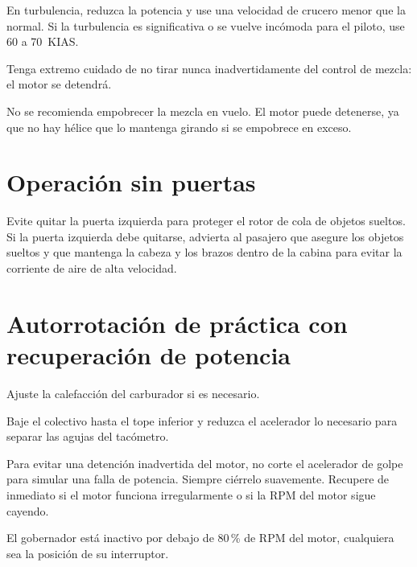 \begin{precaucion}
En turbulencia, reduzca la potencia y use una velocidad de crucero menor que la normal. Si la turbulencia es significativa o se vuelve incómoda para el piloto, use 60 a 70~KIAS.
\end{precaucion}

\begin{precaucion}
Tenga extremo cuidado de no tirar nunca inadvertidamente del control de mezcla: el motor se detendrá.
\end{precaucion}

\begin{precaucion}
No se recomienda empobrecer la mezcla en vuelo. El motor puede detenerse, ya que no hay hélice que lo mantenga girando si se empobrece en exceso.
\end{precaucion}

\section{Operación sin puertas}

Evite quitar la puerta izquierda para proteger el rotor de cola de objetos sueltos. Si la puerta izquierda debe quitarse, advierta al pasajero que asegure los objetos sueltos y que mantenga la cabeza y los brazos dentro de la cabina para evitar la corriente de aire de alta velocidad.

\section{Autorrotación de práctica con recuperación de potencia}

\begin{pasos}
\item Ajuste la calefacción del carburador si es necesario.
\item Baje el colectivo hasta el tope inferior y reduzca el acelerador lo necesario para separar las agujas del tacómetro.
\end{pasos}

\begin{precaucion}
Para evitar una detención inadvertida del motor, no corte el acelerador de golpe para simular una falla de potencia. Siempre ciérrelo suavemente. Recupere de inmediato si el motor funciona irregularmente o si la RPM del motor sigue cayendo.
\end{precaucion}

\begin{nota}
El gobernador está inactivo por debajo de 80\,\% de RPM del motor, cualquiera sea la posición de su interruptor.
\end{nota}


